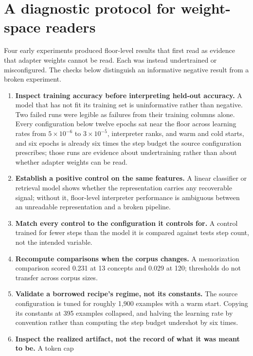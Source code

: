 \documentclass{article}
\begin{document}



\appendix
\section{A diagnostic protocol for weight-space readers}
\label{app:protocol}

Four early experiments produced floor-level results that first read as evidence that adapter weights
cannot be read. Each was instead undertrained or misconfigured. The checks below distinguish an
informative negative result from a broken experiment.

\begin{enumerate}\itemsep2pt
\item \textbf{Inspect training accuracy before interpreting held-out accuracy.} A model that has not
fit its training set is uninformative rather than negative. Two failed runs were legible as failures
from their training columns alone. Every configuration below twelve epochs sat near the floor
across learning rates from $5\times10^{-6}$ to $3\times10^{-5}$, interpreter ranks, and warm and
cold starts, and six epochs is already six times the step budget the source configuration
prescribes; those runs are evidence about undertraining rather than about whether adapter weights
can be read.
\item \textbf{Establish a positive control on the same features.} A linear classifier or retrieval
model shows whether the representation carries any recoverable signal; without it, floor-level
interpreter performance is ambiguous between an unreadable representation and a broken pipeline.
\item \textbf{Match every control to the configuration it controls for.} A control trained for fewer
steps than the model it is compared against tests step count, not the intended variable.
\item \textbf{Recompute comparisons when the corpus changes.} A memorization comparison scored 0.231
at 13 concepts and 0.029 at 120; thresholds do not transfer across corpus sizes.
\item \textbf{Validate a borrowed recipe's regime, not its constants.} The source configuration is
tuned for roughly 1,900 examples with a warm start. Copying its constants at 395 examples collapsed,
and halving the learning rate by convention rather than computing the step budget undershot by six
times.
\item \textbf{Inspect the realized artifact, not the record of what it was meant to be.} A token cap

\end{enumerate}
\end{document}
